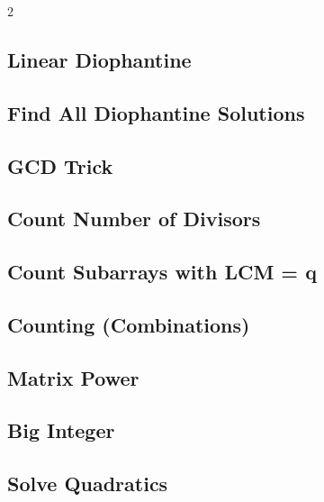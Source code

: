 \documentclass[10pt,a4paper]{extarticle}
\begin{document}
\begin{landscape}
\begin{multicols}{2}
\subsection{Linear Diophantine}


\subsection{Find All Diophantine Solutions}


\subsection{GCD Trick}


\subsection{Count Number of Divisors}


\subsection{Count Subarrays with LCM = q}


\subsection{Counting (Combinations)}


\subsection{Matrix Power}


\subsection{Big Integer}


\subsection{Solve Quadratics}



\end{multicols}
\end{landscape}
\end{document}
